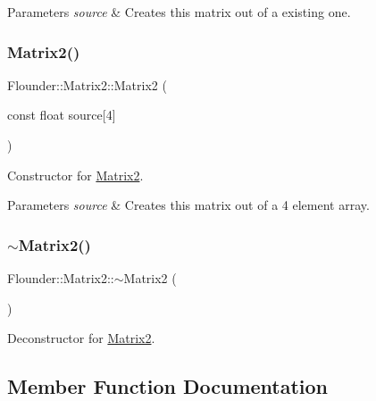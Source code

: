 \begin{DoxyParams}{Parameters}
{\em source} & Creates this matrix out of a existing one. \\
\hline
\end{DoxyParams}
\mbox{\label{class_flounder_1_1_matrix2_ad764a7be2a09d30280b1cc2355e0a379}} 
\subsubsection{\texorpdfstring{Matrix2()}{Matrix2()}\hspace{0.1cm}{\footnotesize\ttfamily [3/3]}}
{\footnotesize\ttfamily Flounder\+::\+Matrix2\+::\+Matrix2 (\begin{DoxyParamCaption}\item[{const float}]{source\mbox{[}4\mbox{]} }\end{DoxyParamCaption})}



Constructor for \hyperlink{class_flounder_1_1_matrix2}{Matrix2}. 


\begin{DoxyParams}{Parameters}
{\em source} & Creates this matrix out of a 4 element array. \\
\hline
\end{DoxyParams}
\mbox{\label{class_flounder_1_1_matrix2_af71b245f5ee40ac4d848be11b70fbeea}} 
\subsubsection{\texorpdfstring{$\sim$\+Matrix2()}{~Matrix2()}}
{\footnotesize\ttfamily Flounder\+::\+Matrix2\+::$\sim$\+Matrix2 (\begin{DoxyParamCaption}{ }\end{DoxyParamCaption})}



Deconstructor for \hyperlink{class_flounder_1_1_matrix2}{Matrix2}. 



\subsection{Member Function Documentation}
\mbox{\label{class_flounder_1_1_matrix2_a319825e3bda48c3e843be127f2ce9b50}} 
